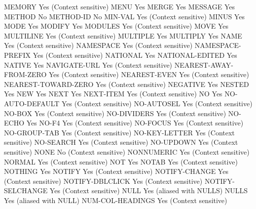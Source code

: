 MEMORY                          Yes (Context sensitive)
MENU                            Yes
MERGE                           Yes
MESSAGE                         Yes
METHOD                          No
METHOD-ID                       No
MIN-VAL                         Yes (Context sensitive)
MINUS                           Yes
MODE                            Yes
MODIFY                          Yes
MODULES                         Yes (Context sensitive)
MOVE                            Yes
MULTILINE                       Yes (Context sensitive)
MULTIPLE                        Yes
MULTIPLY                        Yes
NAME                            Yes (Context sensitive)
NAMESPACE                       Yes (Context sensitive)
NAMESPACE-PREFIX                Yes (Context sensitive)
NATIONAL                        Yes
NATIONAL-EDITED                 Yes
NATIVE                          Yes
NAVIGATE-URL                    Yes (Context sensitive)
NEAREST-AWAY-FROM-ZERO          Yes (Context sensitive)
NEAREST-EVEN                    Yes (Context sensitive)
NEAREST-TOWARD-ZERO             Yes (Context sensitive)
NEGATIVE                        Yes
NESTED                          Yes
NEW                             Yes
NEXT                            Yes
NEXT-ITEM                       Yes (Context sensitive)
NO                              Yes
NO-AUTO-DEFAULT                 Yes (Context sensitive)
NO-AUTOSEL                      Yes (Context sensitive)
NO-BOX                          Yes (Context sensitive)
NO-DIVIDERS                     Yes (Context sensitive)
NO-ECHO                         Yes
NO-F4                           Yes (Context sensitive)
NO-FOCUS                        Yes (Context sensitive)
NO-GROUP-TAB                    Yes (Context sensitive)
NO-KEY-LETTER                   Yes (Context sensitive)
NO-SEARCH                       Yes (Context sensitive)
NO-UPDOWN                       Yes (Context sensitive)
NONE                            No (Context sensitive)
NONNUMERIC                      Yes (Context sensitive)
NORMAL                          Yes (Context sensitive)
NOT                             Yes
NOTAB                           Yes (Context sensitive)
NOTHING                         Yes
NOTIFY                          Yes (Context sensitive)
NOTIFY-CHANGE                   Yes (Context sensitive)
NOTIFY-DBLCLICK                 Yes (Context sensitive)
NOTIFY-SELCHANGE                Yes (Context sensitive)
NULL                            Yes (aliased with NULLS)
NULLS                           Yes (aliased with NULL)
NUM-COL-HEADINGS                Yes (Context sensitive)
